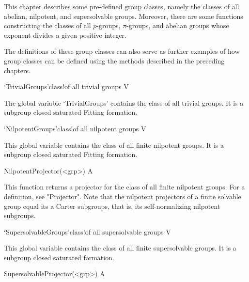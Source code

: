 
This chapter describes some pre-defined 
group classes, namely the classes of all abelian, nilpotent, and supersolvable
groups. Moreover, there are some functions constructing the classes of all
$p$-groups, $\pi$-groups, and abelian groups whose exponent divides a given
positive integer. 

The definitions of these group classes can also serve as further examples of
how group classes can be defined using the methods described in the preceding
chapters.

\null

\>`TrivialGroups'{class}!{of all trivial groups} V

%
The global variable `TrivialGroups' contains the class of all trivial groups. It is a
subgroup closed saturated Fitting formation.

\>`NilpotentGroups'{class}!{of all nilpotent groups} V

%
%
This global variable contains the class of all finite nilpotent groups. It is a
subgroup closed saturated Fitting formation.

\>NilpotentProjector(<grp>) A

%
This function returns a projector for the class of all finite nilpotent
groups. For a definition, see "Projector". Note that the nilpotent projectors
of a finite solvable group equal its a Carter subgroups, that is, its
self-normalizing nilpotent subgroups. 

\>`SupersolvableGroups'{class}!{of all supersolvable groups} V

%
%
This global variable contains the class of all finite supersolvable groups. It
is a subgroup closed saturated formation.

\>SupersolvableProjector(<grp>) A


